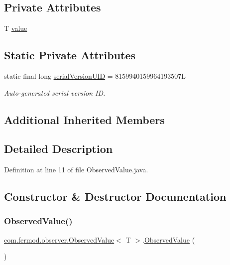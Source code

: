 \subsection*{Private Attributes}
\begin{DoxyCompactItemize}
\item 
T \mbox{\hyperlink{a00034_a947edfec1982817155067f495b0c8cf7}{value}}
\end{DoxyCompactItemize}
\subsection*{Static Private Attributes}
\begin{DoxyCompactItemize}
\item 
static final long \mbox{\hyperlink{a00034_ad494135b9a0d52423069327f49e93937}{serial\+Version\+U\+ID}} = 8159940159964193507L
\begin{DoxyCompactList}\small\item\em Auto-\/generated serial version ID. \end{DoxyCompactList}\end{DoxyCompactItemize}
\subsection*{Additional Inherited Members}


\subsection{Detailed Description}


Definition at line 11 of file Observed\+Value.\+java.



\subsection{Constructor \& Destructor Documentation}
\mbox{\label{a00034_a1df366b11a2df10c94ca920c63888417}} 
\subsubsection{\texorpdfstring{ObservedValue()}{ObservedValue()}\hspace{0.1cm}{\footnotesize\ttfamily [1/2]}}
{\footnotesize\ttfamily \mbox{\hyperlink{a00034}{com.\+fermod.\+observer.\+Observed\+Value}}$<$ T $>$.\mbox{\hyperlink{a00034}{Observed\+Value}} (\begin{DoxyParamCaption}{ }\end{DoxyParamCaption})}



